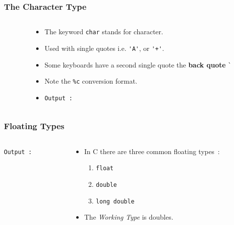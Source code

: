 \begin{frame}[fragile]
\frametitle{The Character Type}

\begin{columns}
\begin{column}{0.55\textwidth}

\end{column}

\begin{column}{0.45\textwidth}
\begin{itemize}[<+->]
\item The  keyword \verb+char+ stands for character.
\item Used with single quotes i.e.
\verb^'A'^, or \verb^'+'^.
\item Some keyboards have a second single quote the {\bf back quote} \verb^`^
\item Note the \verb+%c+ conversion format.
\item {\scriptsize{\tt Output :}}
\end{itemize}
\end{column}

\end{columns}
\end{frame}


\begin{frame}[fragile]
\frametitle{Floating Types}
\begin{columns}
\begin{column}{0.55\textwidth}

{\scriptsize{\tt Output :}}
\end{column}

\begin{column}{0.45\textwidth}
\begin{itemize}[<+->]
\item In C there are three common floating types~:
    \begin{enumerate}[<+->]
        \item \verb+float+
        \item \verb+double+
        \item \verb+long double+
    \end{enumerate}
\item The {\it Working Type} is doubles.
\end{itemize}
\end{column}

\end{columns}
\end{frame}


